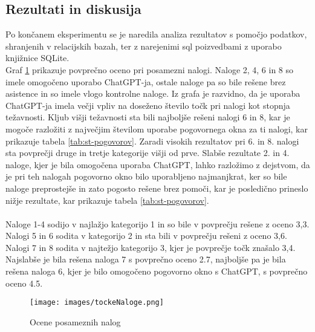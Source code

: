 \documentclass[a4paper,12pt,openright]{book}
\begin{document}
\subsection{Rezultati in diskusija}
Po končanem eksperimentu se je naredila analiza rezultatov s pomočjo podatkov, shranjenih v relacijskih bazah, ter z narejenimi sql poizvedbami z uporabo knjižnice SQLite. \\
Graf \ref{fig:grade_all} prikazuje povprečno oceno pri posamezni nalogi. Naloge 2, 4, 6 in 8 so imele omogočeno uporabo ChatGPT-ja, ostale naloge pa so bile rešene brez asistence in so imele vlogo kontrolne naloge. Iz grafa je razvidno, da je uporaba ChatGPT-ja imela večji vpliv na doseženo število točk pri nalogi  kot stopnja težavnosti. Kljub višji težavnosti sta bili najboljše rešeni nalogi 6 in 8, kar je mogoče razložiti z največjim številom uporabe pogovornega okna za ti nalogi, kar prikazuje tabela \ref{tab:st-pogovorov}.
Zaradi visokih rezultatov pri 6. in 8. nalogi sta povprečji druge in tretje kategorije višji od prve.
Slabše rezultate 2. in 4. naloge, kjer je bila omogočena uporaba ChatGPT, lahko razložimo z dejstvom, da je pri teh nalogah pogovorno okno bilo uporabljeno najmanjkrat, ker so bile naloge preprostejše in zato pogosto rešene brez pomoči, kar je posledično prineslo nižje rezultate, kar prikazuje tabela \ref{tab:st-pogovorov}. \\
\\ Naloge 1-4 sodijo v najlažjo kategorijo 1 in so bile v povprečju rešene z oceno 3,3. Nalogi 5 in 6 sodita v kategorijo 2 in sta bili v povprečju rešeni z oceno 3,6. Nalogi 7 in 8 sodita v najtežjo kategorijo 3, kjer je povprečje točk znašalo 3,4. Najslabše je bila rešena naloga 7 s povprečno oceno 2.7, najboljše pa je bila rešena naloga 6, kjer je bilo omogočeno pogovorno okno s ChatGPT, s povprečno oceno 4.5.

\begin{figure}[H]
    \centering
    \texttt{[image: images/tockeNaloge.png]}
    \caption{Ocene posameznih nalog}
    \label{fig:grade_all}
\end{figure}
\end{document}
